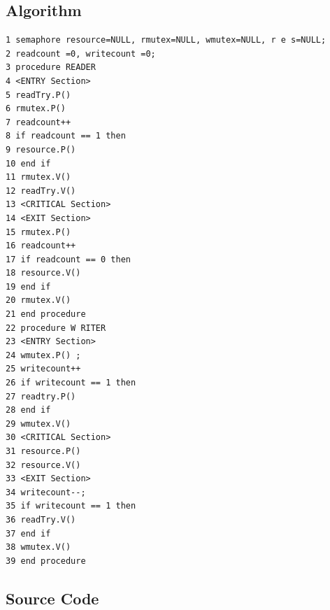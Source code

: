 \subsection{Algorithm}
\begin{verbatim}
1 semaphore resource=NULL, rmutex=NULL, wmutex=NULL, r e s=NULL;
2 readcount =0, writecount =0;
3 procedure READER
4 <ENTRY Section>
5 readTry.P()
6 rmutex.P()
7 readcount++
8 if readcount == 1 then
9 resource.P()
10 end if
11 rmutex.V()
12 readTry.V()
13 <CRITICAL Section>
14 <EXIT Section>
15 rmutex.P()
16 readcount++
17 if readcount == 0 then
18 resource.V()
19 end if
20 rmutex.V()
21 end procedure
22 procedure W RITER
23 <ENTRY Section>
24 wmutex.P() ;
25 writecount++
26 if writecount == 1 then
27 readtry.P()
28 end if
29 wmutex.V()
30 <CRITICAL Section>
31 resource.P()
32 resource.V()
33 <EXIT Section>
34 writecount--;
35 if writecount == 1 then
36 readTry.V()
37 end if
38 wmutex.V()
39 end procedure
\end{verbatim}

\subsection{Source Code}
